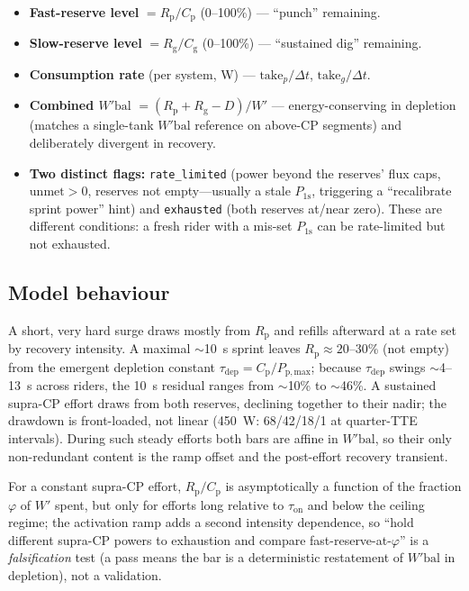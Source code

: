 \documentclass[11pt,a4paper]{article}
\newcommand{\Wp}{\ensuremath{W'}}
\newcommand{\Wbal}{\ensuremath{W'\!\text{bal}}}
\newcommand{\CP}{\ensuremath{\mathrm{CP}}}
\newcommand{\Rp}{\ensuremath{R_{\mathrm p}}}
\newcommand{\Rg}{\ensuremath{R_{\mathrm g}}}
\newcommand{\Cp}{\ensuremath{C_{\mathrm p}}}
\newcommand{\Cg}{\ensuremath{C_{\mathrm g}}}
\newcommand{\Ppmax}{\ensuremath{P_{\mathrm{p,max}}}}
\newcommand{\tauon}{\ensuremath{\tau_{\mathrm{on}}}}
\newcommand{\taudep}{\ensuremath{\tau_{\mathrm{dep}}}}
\newcommand{\Pos}{\ensuremath{P_{1\mathrm s}}}
\begin{document}
\begin{itemize}[leftmargin=1.4em,itemsep=1pt]
\item \textbf{Fast-reserve level} $= \Rp/\Cp$ (0--100\%) --- ``punch'' remaining.
\item \textbf{Slow-reserve level} $= \Rg/\Cg$ (0--100\%) --- ``sustained dig'' remaining.
\item \textbf{Consumption rate} (per system, W) --- $\mathrm{take}_p/\Delta t$, $\mathrm{take}_g/\Delta t$.
\item \textbf{Combined \Wbal} $= (\Rp + \Rg - D)/\Wp$ --- energy-conserving in depletion (matches a
single-tank \Wbal{} reference on above-\CP{} segments) and deliberately divergent in recovery.
\item \textbf{Two distinct flags:} \texttt{rate\_limited} (power beyond the reserves' flux caps,
$\mathrm{unmet}>0$, reserves not empty---usually a stale \Pos, triggering a ``recalibrate sprint power''
hint) and \texttt{exhausted} (both reserves at/near zero). These are different conditions: a fresh rider
with a mis-set \Pos{} can be rate-limited but not exhausted.
\end{itemize}

\subsection{Model behaviour}\label{subsec:behaviour}

A short, very hard surge draws mostly from \Rp{} and refills afterward at a rate set by recovery intensity.
A maximal $\sim$10~s sprint leaves $\Rp \approx 20$--30\% (not empty) from the emergent depletion constant
$\taudep = \Cp/\Ppmax$; because \taudep{} swings $\sim$4--13~s across riders, the 10~s residual ranges from
$\sim$10\% to $\sim$46\%. A sustained supra-\CP{} effort draws from both reserves, declining together to
their nadir; the drawdown is front-loaded, not linear (450~W: 68/42/18/1 at quarter-TTE intervals). During
such steady efforts both bars are affine in \Wbal, so their only non-redundant content is the ramp offset
and the post-effort recovery transient.

For a constant supra-\CP{} effort, $\Rp/\Cp$ is asymptotically a function of the fraction $\varphi$ of \Wp{}
spent, but only for efforts long relative to \tauon{} and below the ceiling regime; the activation ramp
adds a second intensity dependence, so ``hold different supra-\CP{} powers to exhaustion and compare
fast-reserve-at-$\varphi$'' is a \emph{falsification} test (a pass means the bar is a deterministic
restatement of \Wbal{} in depletion), not a validation.
\end{document}
